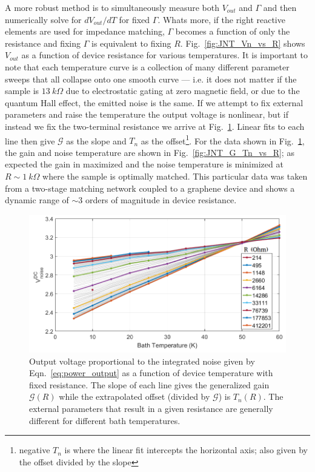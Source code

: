 A more robust method is to simultaneously measure both $V_{out}$ and $\Gamma$ and then numerically solve for $dV_{out}/dT$ for fixed $\Gamma$. Whats more, if the right reactive elements are used for impedance matching, $\Gamma$ becomes a function of only the resistance and fixing $\Gamma$ is equivalent to fixing $R$. Fig.~\ref{fig:JNT_Vn_vs_R} shows $V_{out}$ as a function of device resistance for various temperatures. It is important to note that each temperature curve is a collection of many different parameter sweeps that all collapse onto one smooth curve --- i.e. it does not matter if the sample is $13~k\Omega$ due to electrostatic gating at zero magnetic field, or due to the quantum Hall effect, the emitted noise is the same. If we attempt to fix external parameters and raise the temperature the output voltage is nonlinear, but if instead we fix the two-terminal resistance we arrive at Fig.~\ref{fig:JNT_Vn_vs_T}. Linear fits to each line then give $\mathcal{G}$ as the slope and $T_n$ as the offset\footnote{negative $T_n$ is where the linear fit intercepts the horizontal axis; also given by the offset divided by the slope}. For the data shown in Fig.~\ref{fig:JNT_Vn_vs_T}, the gain and noise temperature are shown in Fig.~\ref{fig:JNT_G_Tn_vs_R}; as expected the gain in maximized and the noise temperature is minimized at $R\sim 1~k\Omega$ where the sample is optimally matched. This particular data was taken from a two-stage matching network coupled to a graphene device and shows a dynamic range of ${\sim}3$ orders of magnitude in device resistance.
\begin{figure}
\centering
\includegraphics[width = 130mm]{figures/Johnson_noise_thermometry/Vn_vs_T}
\caption{Output voltage proportional to the integrated noise given by Eqn.~\ref{eq:power_output} as a function of device temperature with fixed resistance. The slope of each line gives the generalized gain $\mathcal{G}(R)$ while the extrapolated offset (divided by $\mathcal{G}$) is $T_n(R)$. The external parameters that result in a given resistance are generally different for different bath temperatures.}
\label{fig:JNT_Vn_vs_T}
\end{figure}
